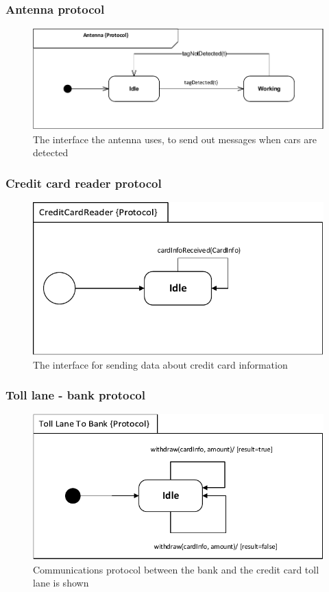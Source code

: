 \subsubsection*{Antenna protocol}
\begin{figure}[H]
\centering
\includegraphics[width=0.7\linewidth]{img/behaviour_state_machines/protocol_state_machines/protocol_state_machine_antenna}
\caption{The interface the antenna uses, to send out messages when cars are detected}
\label{fig:protocol_state_machine_antenna}
\end{figure}

\subsubsection*{Credit card reader protocol}
\begin{figure}[H]
\centering
\includegraphics[width=0.7\linewidth]{img/behaviour_state_machines/protocol_state_machines/protocol_state_machine_tlc_to_ccr}
\caption{The interface for sending data about credit card information}
\label{fig:protocol_state_machine_tlc_to_ccr}
\end{figure}

\subsubsection*{Toll lane - bank protocol}
\begin{figure}[H]
\centering
\includegraphics[width=0.7\linewidth]{img/behaviour_state_machines/protocol_state_machines/protocol_state_machine_tlc_to_bank}
\caption{Communications protocol between the bank and the credit card toll lane is shown}
\label{fig:protocol_state_machine_tlc_to_bank}
\end{figure}

